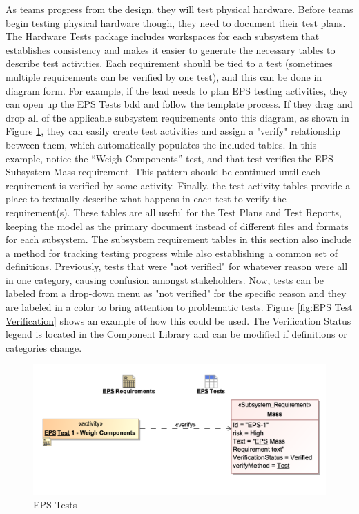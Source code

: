 As teams progress from the design, they will test physical hardware. Before teams begin testing physical hardware though, they need to document their test plans. The Hardware Tests package includes workspaces for each subsystem that establishes consistency and makes it easier to generate the necessary tables to describe test activities. Each requirement should be tied to a test (sometimes multiple requirements can be verified by one test), and this can be done in diagram form. For example, if the  lead needs to plan EPS testing activities, they can open up the EPS Tests bdd and follow the template process. If they drag and drop all of the applicable subsystem requirements onto this diagram, as shown in Figure \ref{fig:EPS Tests}, they can easily create test activities and assign a "verify" relationship between them, which automatically populates the included tables. In this example, notice the “Weigh Components” test, and that test verifies the EPS Subsystem Mass requirement. This pattern should be continued until each requirement is verified by some activity. Finally, the test activity tables provide a place to textually describe what happens in each test to verify the requirement(s). These tables are all useful for the Test Plans and Test Reports, keeping the model as the primary document instead of different files and formats for each subsystem. The subsystem requirement tables in this section also include a method for tracking testing progress while also establishing a common set of definitions. Previously, tests that were "not verified" for whatever reason were all in one category, causing confusion amongst stakeholders. Now, tests can be labeled from a drop-down menu as "not verified" for the specific reason and they are labeled in a color to bring attention to problematic tests. Figure \ref{fig:EPS Test Verification} shows an example of how this could be used. The Verification Status legend is located in the Component Library and can be modified if definitions or categories change.

\begin{figure}[H]
    \centering
    \includegraphics[width=\textwidth]{Thesis/Analysis_and_Results/Analysis and Results Figures/EPS tests.png}
    \caption{EPS Tests}
    \label{fig:EPS Tests}
\end{figure}

